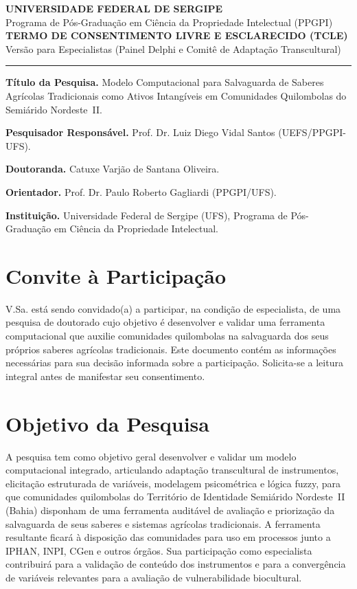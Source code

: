 \documentclass[12pt,a4paper,brazil]{article}
\begin{document}
\begin{center}
{\large\bfseries UNIVERSIDADE FEDERAL DE SERGIPE}\\[0.3cm]
{\normalsize Programa de Pós-Graduação em Ciência da Propriedade Intelectual (PPGPI)}\\[1cm]
{\Large\bfseries TERMO DE CONSENTIMENTO LIVRE E ESCLARECIDO (TCLE)}\\[0.3cm]
{\normalsize Versão para Especialistas (Painel Delphi e Comitê de Adaptação Transcultural)}\\[0.5cm]
\noindent\rule{\textwidth}{0.4pt}
\end{center}

\vspace{0.5cm}

\noindent\textbf{Título da Pesquisa.} Modelo Computacional para Salvaguarda de Saberes Agrícolas Tradicionais como Ativos Intangíveis em Comunidades Quilombolas do Semiárido Nordeste~II.

\noindent\textbf{Pesquisador Responsável.} Prof. Dr. Luiz Diego Vidal Santos (UEFS/PPGPI-UFS).

\noindent\textbf{Doutoranda.} Catuxe Varjão de Santana Oliveira.

\noindent\textbf{Orientador.} Prof. Dr. Paulo Roberto Gagliardi (PPGPI/UFS).

\noindent\textbf{Instituição.} Universidade Federal de Sergipe (UFS), Programa de Pós-Graduação em Ciência da Propriedade Intelectual.

\vspace{0.5cm}

\section*{Convite à Participação}

V.Sa. está sendo convidado(a) a participar, na condição de especialista, de uma pesquisa de doutorado cujo objetivo é desenvolver e validar uma ferramenta computacional que auxilie comunidades quilombolas na salvaguarda dos seus próprios saberes agrícolas tradicionais. Este documento contém as informações necessárias para sua decisão informada sobre a participação. Solicita-se a leitura integral antes de manifestar seu consentimento.

\section*{Objetivo da Pesquisa}

A pesquisa tem como objetivo geral desenvolver e validar um modelo computacional integrado, articulando adaptação transcultural de instrumentos, elicitação estruturada de variáveis, modelagem psicométrica e lógica fuzzy, para que comunidades quilombolas do Território de Identidade Semiárido Nordeste~II (Bahia) disponham de uma ferramenta auditável de avaliação e priorização da salvaguarda de seus saberes e sistemas agrícolas tradicionais. A ferramenta resultante ficará à disposição das comunidades para uso em processos junto a IPHAN, INPI, CGen e outros órgãos. Sua participação como especialista contribuirá para a validação de conteúdo dos instrumentos e para a convergência de variáveis relevantes para a avaliação de vulnerabilidade biocultural.
\end{document}

